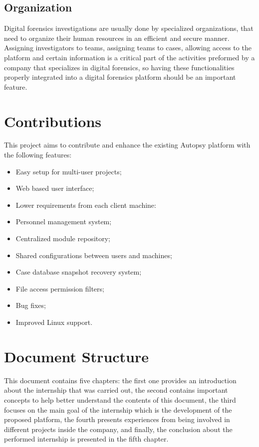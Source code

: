 \subsection{Organization}

Digital forensics investigations are usually done by specialized organizations, that need to organize their human resources in an efficient and secure manner.
Assigning investigators to teams, assigning teams to cases, allowing access to the platform and certain information is a critical part of the activities preformed by
a company that specializes in digital forensics, so having these functionalities properly integrated into a digital forensics platform should be an important feature.

\section{Contributions}

This project aims to contribute and enhance the existing Autopsy platform with the following features:

\begin{itemize}
 \item Easy setup for multi-user projects;
 \item Web based user interface;
 \item Lower requirements from each client machine:
 \item Personnel management system;
 \item Centralized module repository;
 \item Shared configurations between users and machines;
 \item Case database snapshot recovery system;
 \item File access permission filters;
 \item Bug fixes;
 \item Improved Linux \cite{linux} support.
\end{itemize}

\section{Document Structure}

This document contains five chapters: the first one provides an introduction about the internship that was carried out, 
the second contains important concepts to help better understand the contents of this document, the third focuses on the main goal of the internship which is the development
of the proposed platform, the fourth presents experiences from being involved in different projects inside the company,
and finally, the conclusion about the performed internship is presented in the fifth chapter.
